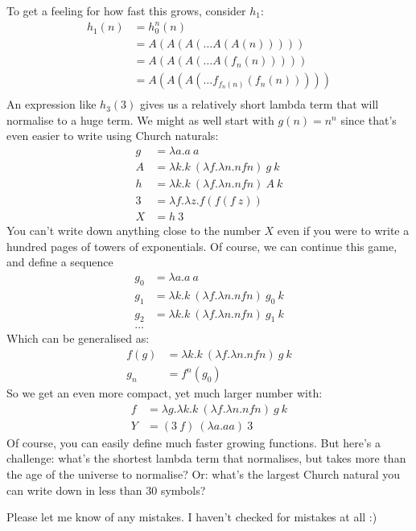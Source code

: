 \documentclass[a4paper, 11pt]{article}
\theoremstyle{definition}
\begin{document}
To get a feeling for how fast this grows, consider $h_1$:
\begin{align*}
  h_1(n) &= h_0^n(n)\\
         &= A(A(A(\dots A(A(n)))))\\
         &= A(A(A(\dots A(f_n(n)))))\\
         &= A(A(A(\dots f_{f_n(n)}(f_n(n)))))\\
\end{align*}
An expression like $h_3(3)$ gives us a relatively short lambda term that will normalise to a huge term. We might as well start with $g(n) = n^n$ since that's even easier to write using Church naturals:
\begin{align*}
  g &= \lambda a. a\ a\\
  A &= \lambda k. k\ (\lambda f. \lambda n. n f n)\ g\ k\\
  h &= \lambda k. k\ (\lambda f. \lambda n. n f n)\ A\ k\\
  3 &= \lambda f. \lambda z. f (f (f\ z))\\
  X &= h\ 3
\end{align*}
You can't write down anything close to the number $X$ even if you were to write a hundred pages of towers of exponentials. Of course, we can continue this game, and define a sequence
\begin{align*}
  g_0 &= \lambda a. a\ a\\
  g_1 &= \lambda k. k\ (\lambda f. \lambda n. n f n)\ g_0\ k\\
  g_2 &= \lambda k. k\ (\lambda f. \lambda n. n f n)\ g_1\ k\\
  \dots
\end{align*}
Which can be generalised as:
\begin{align*}
  f(g) &= \lambda k. k\ (\lambda f. \lambda n. n f n)\ g\ k\\
  g_n &= f^n(g_0)
\end{align*}
So we get an even more compact, yet much larger number with:
\begin{align*}
  f &= \lambda g. \lambda k. k\ (\lambda f. \lambda n. n f n)\ g\ k\\
  Y &= (3\ f)\ (\lambda a. a a)\ 3
\end{align*}
Of course, you can easily define much faster growing functions. But here's a challenge: what's the shortest lambda term that normalises, but takes more than the age of the universe to normalise? Or: what's the largest Church natural you can write down in less than 30 symbols?

Please let me know of any mistakes. I haven't checked for mistakes at all :)
\end{document}
